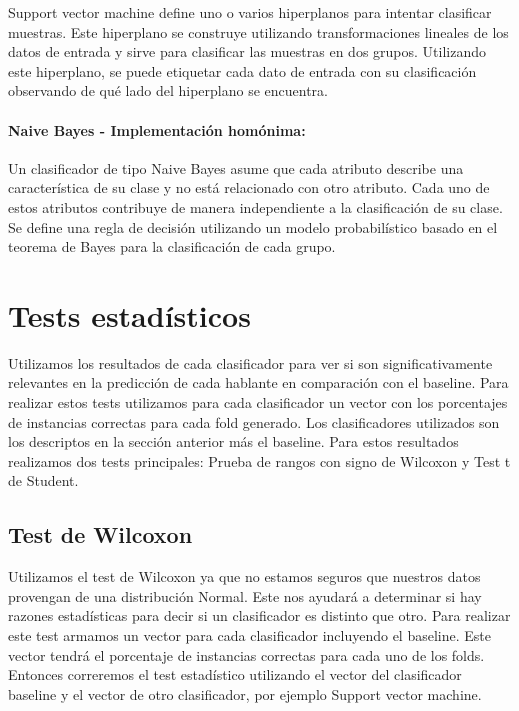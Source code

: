 
Support vector machine define uno o varios hiperplanos para intentar clasificar muestras. Este hiperplano se construye utilizando transformaciones lineales de los datos de entrada y sirve para clasificar las muestras en dos grupos. Utilizando este hiperplano, se puede etiquetar cada dato de entrada con su clasificación observando de qué lado del hiperplano se encuentra.

\paragraph{Naive Bayes \cite{DBLP:conf/flairs/Zhang04} - Implementación homónima:}


Un clasificador de tipo Naive Bayes asume que cada atributo describe una característica de su clase y no está relacionado con otro atributo. Cada uno de estos atributos contribuye de manera independiente a la clasificación de su clase. Se define una regla de decisión utilizando un modelo probabilístico basado en el teorema de Bayes para la clasificación de cada grupo.

\section{Tests estadísticos}

Utilizamos los resultados de cada clasificador para ver si son significativamente relevantes en la predicción de cada hablante en comparación con el baseline. Para realizar estos tests utilizamos para cada clasificador un vector con los porcentajes de instancias correctas para cada fold generado. Los clasificadores utilizados son los descriptos en la sección anterior más el baseline. Para estos resultados realizamos dos tests principales: Prueba de rangos con signo de Wilcoxon y Test t de Student. 

\subsection{Test de Wilcoxon}

Utilizamos el test de Wilcoxon ya que no estamos seguros que nuestros datos provengan de una distribución Normal. Este nos ayudará a determinar si hay razones estadísticas para decir si un clasificador es distinto que otro. Para realizar este test armamos un vector para cada clasificador incluyendo el baseline. Este vector tendrá el porcentaje de instancias correctas para cada uno de los folds. Entonces correremos el test estadístico utilizando el vector del clasificador baseline y el vector de otro clasificador, por ejemplo Support vector machine.


